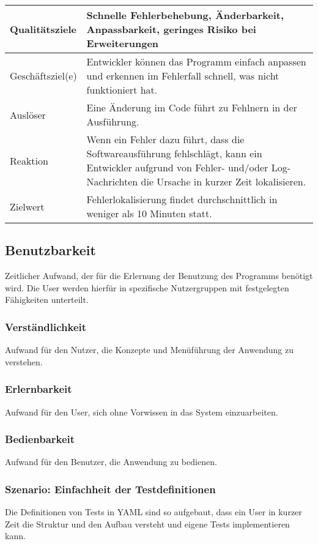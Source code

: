 \documentclass[
	ngerman,
	toc=listof, %
	toc=bibliography, %
	footnotes=multiple, %
	parskip=half, %
	numbers=noendperiod %
]{scrartcl}
\begin{document}
			\begin{tabularx}{\textwidth}{lX}
				\toprule
				Qualitätsziele & Schnelle Fehlerbehebung, Änderbarkeit, Anpassbarkeit, geringes Risiko bei Erweiterungen  \\
				\midrule
				Geschäftsziel(e) & Entwickler können das Programm einfach anpassen und erkennen im Fehlerfall schnell, was nicht funktioniert hat.  \\
				\midrule
				Auslöser & Eine Änderung im Code führt zu Fehlnern in der Ausführung.  \\
				\midrule
				Reaktion & Wenn ein Fehler dazu führt, dass die Softwareausführung fehlschlägt, kann ein Entwickler aufgrund von Fehler- und/oder Log-Nachrichten die Ursache in kurzer Zeit lokalisieren.  \\
				\midrule
				Zielwert & Fehlerlokalisierung findet durchschnittlich in weniger als 10 Minuten statt.  \\
				\bottomrule
			\end{tabularx}

	\subsection{Benutzbarkeit}
		Zeitlicher Aufwand, der für die Erlernung der Benutzung des Programms benötigt wird. Die User werden hierfür in spezifische Nutzergruppen mit festgelegten Fähigkeiten unterteilt.
		
		\subsubsection{Verständlichkeit}
			Aufwand für den Nutzer, die Konzepte und Menüführung der Anwendung zu verstehen.

		\subsubsection{Erlernbarkeit}
			Aufwand für den User, sich ohne Vorwissen in das System einzuarbeiten.

		\subsubsection{Bedienbarkeit}
			Aufwand für den Benutzer, die Anwendung zu bedienen.

		\subsubsection{Szenario: Einfachheit der Testdefinitionen}
			Die Definitionen von Tests in YAML sind so aufgebaut, dass ein User in kurzer Zeit die Struktur und den Aufbau versteht und eigene Tests implementieren kann.
			
\end{document}
